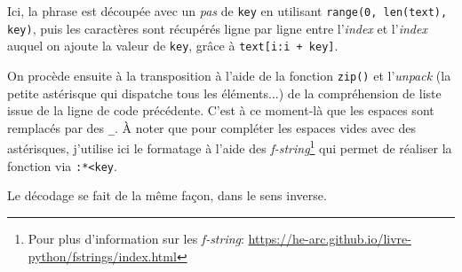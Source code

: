 Ici, la phrase est découpée avec un \textit{pas} de \texttt{key} en utilisant \texttt{range(0, len(text), key)}, puis les caractères sont récupérés ligne par ligne entre l'\textit{index} et l'\textit{index} auquel on ajoute la valeur de \texttt{key}, grâce à \texttt{text[i:i + key]}.
\medskip

On procède ensuite à la transposition à l'aide de la fonction \texttt{zip()} et l'\textit{unpack} (la petite astérisque qui dispatche tous les éléments...) de la compréhension de liste issue de la ligne de code précédente. C'est à ce moment-là que les espaces sont remplacés par des \og \texttt{\_}\fg{}. À noter que pour compléter les espaces vides avec des astérisques, j'utilise ici le formatage à l'aide des \textit{f-string}\footnote{Pour plus d'information sur les \textit{f-string}: \url{https://he-arc.github.io/livre-python/fstrings/index.html}} qui permet de réaliser la fonction via  \texttt{:*<{key}}.
\medskip

Le décodage se fait de la même façon, dans le sens inverse.
\medskip

